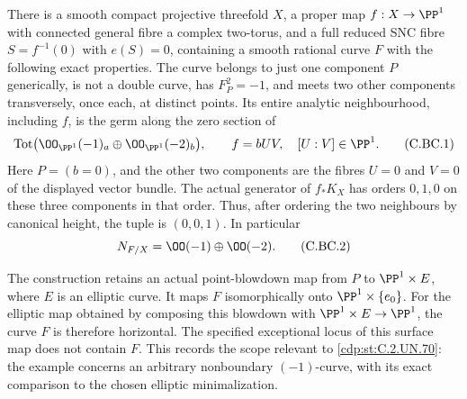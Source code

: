 \begin{proposition}\label{cdp:st:C.2.UN.79}

There is a smooth compact projective threefold \(X\), a proper map
\(f:X\to\PP^1\) with connected general fibre a complex two-torus,
and a full reduced SNC fibre \(S=f^{-1}(0)\) with \(e(S)=0\),
containing a smooth rational curve \(F\) with the following exact
properties. The curve belongs to just one component \(P\) generically,
is not a double curve, has \(F_P^2=-1\), and meets two other
components transversely, once each, at distinct points. Its entire
analytic neighbourhood, including \(f\), is the germ along the zero
section of
\[
 \operatorname{Tot}\bigl(\OO_{\PP^1}(-1)_a
                 \oplus\OO_{\PP^1}(-2)_b\bigr),\qquad
 f=bUV,\quad [U:V]\in\PP^1.                         \tag{C.BC.1}\label{cdp:eq:C.BC.1}
\]
Here \(P=(b=0)\), and the other two components are the fibres
\(U=0\) and \(V=0\) of the displayed vector bundle.
The actual generator of \(f_*K_X\) has orders \(0,1,0\)
on these three components in that order. Thus, after ordering the
two neighbours by canonical height, the tuple is \((0,0,1)\).
In particular
\[
                    N_{F/X}=\OO(-1)\oplus\OO(-2).            \tag{C.BC.2}\label{cdp:eq:C.BC.2}
\]

The construction retains an actual point-blowdown map from \(P\)
to \(\PP^1\times E\), where \(E\) is an elliptic curve.
It maps \(F\) isomorphically onto \(\PP^1\times\{e_0\}\).
For the elliptic map obtained by composing this blowdown with
\(\PP^1\times E\to\PP^1\), the curve \(F\) is therefore
horizontal. The specified exceptional locus of this surface map
does not contain \(F\). This records the scope relevant to \ref{cdp:st:C.2.UN.70}:
the example concerns an arbitrary nonboundary \((-1)\)-curve,
with its exact comparison to the chosen elliptic minimalization.
\end{proposition}

